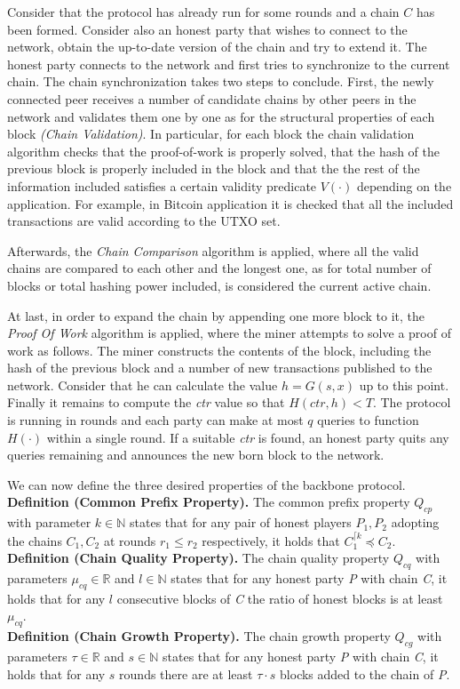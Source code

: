 \documentclass[10pt,a4paper]{article}
\theoremstyle{plain}
\theoremstyle{definition}
\begin{document}
Consider that the protocol has already run for some rounds and a chain $C$ has been formed. Consider
also an honest party that wishes to connect to the network, obtain the up-to-date version of the
chain and try to extend it.
The honest party connects to the network and first tries to synchronize to the current chain. The
chain synchronization takes two steps to conclude. First, the newly connected peer receives a number
of candidate chains by other peers in the network and validates them one by one as for the structural 
properties of each block \textit{(Chain Validation)}. In particular, for each block the chain
validation algorithm checks that the proof-of-work is properly solved, that the hash of the previous
block is properly included in the block and that the the rest of the information included satisfies
a certain validity predicate $V(\cdot)$ depending on the application. For example, in Bitcoin
application it is checked that all the included transactions are valid according to the
UTXO set.

Afterwards, the \textit{Chain Comparison} algorithm is applied, where all the valid chains are
compared to each other and the longest one, as for total number of blocks or total hashing power
included, is considered the current active chain.

At last, in order to expand the chain by appending one more block to it, the \textit{Proof Of Work}
algorithm is applied, where the miner attempts to solve a proof of work as follows. The miner
constructs the contents of the block, including the hash of the previous block and a number of new
transactions published to the network. Consider that he can calculate the value $h = G(s,x)$ up
to this point. Finally it remains to compute the \textit{ctr} value so that $H(ctr, h) < T$. The
protocol is running in rounds and each party can make at most $q$ queries to function $H(\cdot)$
within a single round. If a suitable \textit{ctr} is found, an honest party quits any queries
remaining and announces the new born block to the network.

We can now define the three desired properties of the backbone protocol.\\
\textbf{Definition (Common Prefix Property).} The common prefix property $Q_{cp}$ with parameter
$k \in \mathbb{N}$ states that for any pair of honest players $P_1, P_2$ adopting the chains
$C_1, C_2$ at rounds $r_1 \leq r_2$ respectively, it holds that $C_1^{\lceil k} \preceq C_2$.\\
\textbf{Definition (Chain Quality Property).} The chain quality property $Q_{cq}$ with
parameters $\mu_{cq} \in \mathbb{R}$ and $l \in \mathbb{N}$ states that for any honest
party \textit{P} with chain \textit{C}, it holds that for any $l$ consecutive
blocks of \textit{C} the ratio of honest blocks is at least $\mu_{cq}$.\\
\textbf{Definition (Chain Growth Property).} The chain growth property $Q_{cg}$ with
parameters $\tau \in \mathbb{R}$ and $s \in \mathbb{N}$ states that for any honest party
\textit{P} with chain \textit{C}, it holds that for any $s$ rounds there are at least 
$\tau \cdot s$ blocks added to the chain of \textit{P}.
\end{document}
